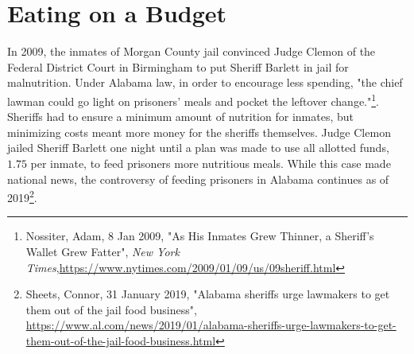 \begin{comment}
Since acres are in thousands, divide the constraints of timber and animal grazing by 1000 in the problem setup, and compensate for this after obtaining a solution.

The problem can be written as follows:
\begin{align*}
\text{maximize } &\sum\limits_{i=1}^7 \sum\limits_{j=1}^3 p_{i,j}x_{i,j} \\
\text{subject to } &\sum\limits_{j=1}^3 x_{i,j} = s_i  \text{ for } i=1,..,7 \\
	        &\sum\limits_{i=1}^7 \sum\limits_{j=1}^3 t_{i,j}x_{i,j} \geq 40,000 \\
		&\sum\limits_{i=1}^7 \sum\limits_{j=1}^3 g_{i,j}x_{i,j} \geq 5 \\
		&\frac{1}{788} \sum\limits_{i=1}^7 \sum\limits_{j=1}^3 w_{i,j}x_{i,j} \geq 70 \\
		&x_{i,j} \geq 0 \text{ for } i=1,...,7  \text{ and } j=1,2,3
\end{align*}

\begin{problem}
Solve the allocation problem above.
Return the minimizing allocation vector of $x_{i,j}$'s and the maximum total net present value.
Remember to consider the following:
\begin{enumerate}
\item The allocation vector should be a (21,1) NumPy array.
\item Recall that the constraints of timber and animal grazing were divided by 1000.
To compensate, the maximum total net value will be equal to the primal objective of the appropriately minimized linear function multiplied by -1000.
\end{enumerate}
\end{problem}

\end{comment}

\section*{Eating on a Budget}

In 2009, the inmates of Morgan County jail convinced Judge Clemon of the Federal District Court in Birmingham to put Sheriff Barlett in jail for malnutrition.
Under Alabama law, in order to encourage less spending, "the chief lawman could go light on prisoners' meals and pocket the leftover change."\footnote[1]{Nossiter, Adam, 8 Jan 2009, "As His Inmates Grew Thinner, a Sheriff’s Wallet Grew Fatter", \emph{New York Times},\url{https://www.nytimes.com/2009/01/09/us/09sheriff.html}}.
Sheriffs had to ensure a minimum amount of nutrition for inmates, but minimizing costs meant more money for the sheriffs themselves.
Judge Clemon jailed Sheriff Barlett one night until a plan was made to use all allotted funds, $1.75$ per inmate, to feed prisoners more nutritious meals.
While this case made national news, the controversy of feeding prisoners in Alabama continues as of 2019\footnote[2]{Sheets, Connor, 31 January 2019, "Alabama sheriffs urge lawmakers to get them out of the jail food business", \url{https://www.al.com/news/2019/01/alabama-sheriffs-urge-lawmakers-to-get-them-out-of-the-jail-food-business.html}}.

